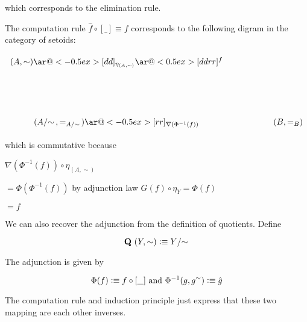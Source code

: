 which corresponds to the elimination rule.

The computation rule $\hat{f} \circ [\_] \equiv f$ corresponds to the following digram in the category of setoids:


\[\xymatrix{
(A,\sim)\ar@<-0.5ex>[dd]_{\eta_{(A,\sim)}}\ar@<0.5ex>[ddrr]^{f} \\ \\
(\qset{A}, =_{\qset{A}})\ar@<-0.5ex>[rr]_{\nabla(\Phi^{-1}(f))} & & (B , =_{B})
}\]

which is commutative because

$\nabla (\Phi^{-1}(f)) \circ \eta_{(A,\sim)}$

$=\Phi(\Phi^{-1}(f))$ by adjunction law $G(f) \circ \eta_{Y} = \Phi(f)$

$=f$



We can also recover the adjunction from the definition of quotients. Define

$$\textbf{Q} ~ (Y , \sim) \defeq \qset{Y}$$

The adjunction is given by

$$\Phi(f) \vcentcolon\equiv f \circ [\_] ~\text{and} ~ \Phi^{-1}  (g, g^{\sim}) \vcentcolon\equiv \hat{g}$$

The computation rule and induction principle just express that these two mapping are each other inverses.
















